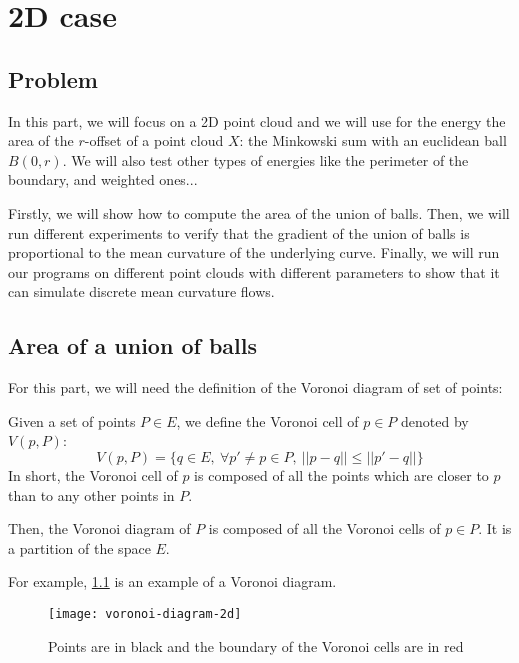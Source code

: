 \chapter{2D case}

\section{Problem}

In this part, we will focus on a 2D point cloud and we will use for the energy
the area of the $ r $-offset of a point cloud $ X $: the Minkowski sum with an
euclidean ball $ B(0, r) $. We will also test other types of energies like the
perimeter of the boundary, and weighted ones...

Firstly, we will show how to compute the area of the union of balls.
Then, we will run different experiments to verify that the gradient of
the union of balls is proportional to the mean curvature of the underlying
curve. Finally, we will run our programs on different point clouds with
different parameters to show that it can simulate discrete mean curvature flows.

\section{Area of a union of balls}

For this part, we will need the definition of the Voronoi diagram of set of
points:

\begin{definition}
    Given a set of points $ P \in E $, we define the Voronoi cell of $ p \in P $
    denoted by $ V(p, P) $:
    $$ V(p, P) = \{ q \in E,~ \forall p' \neq p \in P,~|| p  - q || \leq || p' -
    q || \} $$
    In short, the Voronoi cell of $ p $ is composed of all the points which are
    closer to $ p $ than to any other points in $ P $.

    Then, the Voronoi diagram of $ P $ is composed of all the Voronoi cells of $
    p \in P $. It is a partition of the space $ E $.
\end{definition}

For example, \ref{fig:voronoi-diagram-2d} is an example of a Voronoi diagram.

\begin{figure}[h]
    \centering
    \texttt{[image: voronoi-diagram-2d]}
    \caption{Points are in black and the boundary of the Voronoi cells are in
        red}
    \label{fig:voronoi-diagram-2d}
\end{figure}


